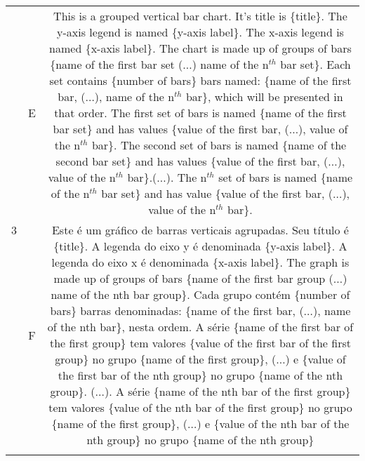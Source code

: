 \begin{table}[htbp]
\begin{tabular}{|c|c|c|}
\multirow{15}{*}{3} & \multirow{6}{*}{E} & \multirow{6}{15cm}{This is a grouped vertical bar chart. It's title is \{title\}. The y-axis legend is named \{y-axis label\}. The x-axis legend is named \{x-axis label\}. The chart is made up of groups of bars \{name of the first bar set ($\ldots$) name of the n$^{th}$ bar set\}. Each set contains \{number of bars\} bars named: \{name of the first bar, ($\ldots$), name of the n$^{th}$ bar\}, which will be presented in that order. The first set of bars is named \{name of the first bar set\} and has values \{value of the first bar, ($\ldots$), value of the n$^{th}$ bar\}. The second set of bars is named \{name of the second bar set\} and has values \{value of the first bar, ($\ldots$), value of the n$^{th}$ bar\}.($\ldots$). The n$^{th}$ set of bars is named \{name of the n$^{th}$ bar set\} and has value \{value of the first bar, ($\ldots$), value of the n$^{th}$ bar\}.}\\
& &\\
& & \\
& &\\
& &\\
&  &\\ \cline{2-3}

\begin{comment}
& \multirow{6}{*}{F} & \multirow{6}{15cm}{Este é um gráfico de barras verticais agrupadas. Seu título é \{title\}. A legenda do eixo y é denominada \{y-axis label\}. A legenda do eixo x é denominada \{x-axis label\}. The graph is made up of groups of bars \{name of the first bar group ($\ldots$) name of the nth bar group\}. Cada grupo contém \{number of bars\} barras denominadas: \{name of the first bar, ($\ldots$), name of the nth bar\}, nesta ordem. A série \{name of the first bar of the first group\} tem valores \{value of the first bar of the first group\} no grupo \{name of the first group\}, ($\ldots$) e \{value of the first bar of the nth group\} no grupo \{name of the nth group\}. ($\ldots$). A série \{name of the nth bar of the first group\} tem valores \{value of the nth bar of the first group\} no grupo \{name of the first group\}, ($\ldots$) e \{value of the nth bar of the nth group\} no grupo \{name of the nth group\}}\\
& &\\
& & \\
& &\\
& &\\
&  &\\ \cline{2-3}
\end{comment}


\end{tabular}
\end{table}
